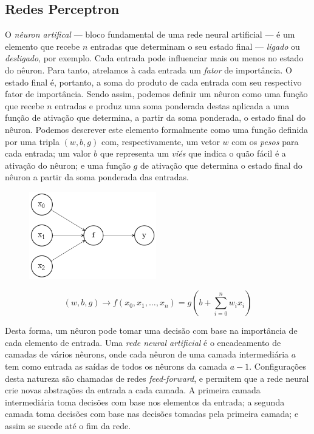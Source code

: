\documentclass[12pt, a4paper]{article}
\begin{document}
\subsection{Redes Perceptron}
O \emph{nêuron artifical} --- bloco fundamental de uma rede neural artificial --- é um elemento que recebe $n$ entradas que determinam o seu estado final --- \emph{ligado} ou \emph{desligado}, por exemplo. Cada entrada pode influenciar mais ou menos no estado do nêuron. Para tanto, atrelamos à cada entrada um \emph{fator} de importância. O estado final é, portanto, a soma do produto de cada entrada com seu respectivo fator de importância. Sendo assim, podemos definir um nêuron como uma função que recebe $n$ entradas e produz uma soma ponderada destas aplicada a uma função de ativação que determina, a partir da soma ponderada, o estado final do nêuron. Podemos descrever este elemento formalmente como uma função definida por uma tripla $(w, b, g)$ com, respectivamente, um vetor $w$ com os \emph{pesos} para cada entrada; um valor $b$ que representa um \emph{viés} que indica o quão fácil é a ativação do nêuron; e uma função $g$ de ativação que determina o estado final do nêuron a partir da soma ponderada das entradas.

\begin{figure}[ht]
	\centering
	\includegraphics[width=\textwidth, height=3.8cm, keepaspectratio=true]{fig/perceptron}
\end{figure}

\begin{equation}
(w, b, g) \rightarrow f(x_0, x_1, \dotsc, x_n) = g\left(b + \displaystyle\sum_{i=0}^{n} w_i x_i \right)
\end{equation}

Desta forma, um nêuron pode tomar uma decisão com base na importância de cada elemento de entrada. Uma \emph{rede neural artificial} é o encadeamento de camadas de vários nêurons, onde cada nêuron de uma camada intermediária $a$ tem como entrada as saídas de todos os nêurons da camada $a - 1$. Configurações desta natureza são chamadas de redes \emph{feed-forward}, e permitem que a rede neural crie novas abstrações da entrada a cada camada. A primeira camada intermediária toma decisões com base nos elementos da entrada; a segunda camada toma decisões com base nas decisões tomadas pela primeira camada; e assim se sucede até o fim da rede.
\end{document}
